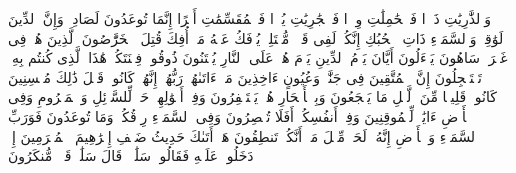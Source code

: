\stopbuffer%
\startbuffer[\q:51:1]
وَٱلذَّٰرِیَٰتِ ذَرۡوࣰا%
\stopbuffer%
\startbuffer[\q:51:2]
فَٱلۡحَٰمِلَٰتِ وِقۡرࣰا%
\stopbuffer%
\startbuffer[\q:51:3]
فَٱلۡجَٰرِیَٰتِ یُسۡرࣰا%
\stopbuffer%
\startbuffer[\q:51:4]
فَٱلۡمُقَسِّمَٰتِ أَمۡرًا%
\stopbuffer%
\startbuffer[\q:51:5]
إِنَّمَا تُوعَدُونَ لَصَادِقࣱ%
\stopbuffer%
\startbuffer[\q:51:6]
وَإِنَّ ٱلدِّینَ لَوَٰقِعࣱ%
\stopbuffer%
\startbuffer[\q:51:7]
وَٱلسَّمَاۤءِ ذَاتِ ٱلۡحُبُكِ%
\stopbuffer%
\startbuffer[\q:51:8]
إِنَّكُمۡ لَفِی قَوۡلࣲ مُّخۡتَلِفࣲ%
\stopbuffer%
\startbuffer[\q:51:9]
یُؤۡفَكُ عَنۡهُ مَنۡ أُفِكَ%
\stopbuffer%
\startbuffer[\q:51:10]
قُتِلَ ٱلۡخَرَّٰصُونَ%
\stopbuffer%
\startbuffer[\q:51:11]
ٱلَّذِینَ هُمۡ فِی غَمۡرَةࣲ سَاهُونَ%
\stopbuffer%
\startbuffer[\q:51:12]
یَسۡءَلُونَ أَیَّانَ یَوۡمُ ٱلدِّینِ%
\stopbuffer%
\startbuffer[\q:51:13]
یَوۡمَ هُمۡ عَلَى ٱلنَّارِ یُفۡتَنُونَ%
\stopbuffer%
\startbuffer[\q:51:14]
ذُوقُوا۟ فِتۡنَتَكُمۡ هَٰذَا ٱلَّذِی كُنتُم بِهِۦ تَسۡتَعۡجِلُونَ%
\stopbuffer%
\startbuffer[\q:51:15]
إِنَّ ٱلۡمُتَّقِینَ فِی جَنَّٰتࣲ وَعُیُونٍ%
\stopbuffer%
\startbuffer[\q:51:16]
ءَاخِذِینَ مَاۤ ءَاتَىٰهُمۡ رَبُّهُمۡۚ إِنَّهُمۡ كَانُوا۟ قَبۡلَ ذَٰلِكَ مُحۡسِنِینَ%
\stopbuffer%
\startbuffer[\q:51:17]
كَانُوا۟ قَلِیلࣰا مِّنَ ٱلَّیۡلِ مَا یَهۡجَعُونَ%
\stopbuffer%
\startbuffer[\q:51:18]
وَبِٱلۡأَسۡحَارِ هُمۡ یَسۡتَغۡفِرُونَ%
\stopbuffer%
\startbuffer[\q:51:19]
وَفِیۤ أَمۡوَٰلِهِمۡ حَقࣱّ لِّلسَّاۤئِلِ وَٱلۡمَحۡرُومِ%
\stopbuffer%
\startbuffer[\q:51:20]
وَفِی ٱلۡأَرۡضِ ءَایَٰتࣱ لِّلۡمُوقِنِینَ%
\stopbuffer%
\startbuffer[\q:51:21]
وَفِیۤ أَنفُسِكُمۡۚ أَفَلَا تُبۡصِرُونَ%
\stopbuffer%
\startbuffer[\q:51:22]
وَفِی ٱلسَّمَاۤءِ رِزۡقُكُمۡ وَمَا تُوعَدُونَ%
\stopbuffer%
\startbuffer[\q:51:23]
فَوَرَبِّ ٱلسَّمَاۤءِ وَٱلۡأَرۡضِ إِنَّهُۥ لَحَقࣱّ مِّثۡلَ مَاۤ أَنَّكُمۡ تَنطِقُونَ%
\stopbuffer%
\startbuffer[\q:51:24]
هَلۡ أَتَىٰكَ حَدِیثُ ضَیۡفِ إِبۡرَٰهِیمَ ٱلۡمُكۡرَمِینَ%
\stopbuffer%
\startbuffer[\q:51:25]
إِذۡ دَخَلُوا۟ عَلَیۡهِ فَقَالُوا۟ سَلَٰمࣰاۖ قَالَ سَلَٰمࣱ قَوۡمࣱ مُّنكَرُونَ%
\stopbuffer%
